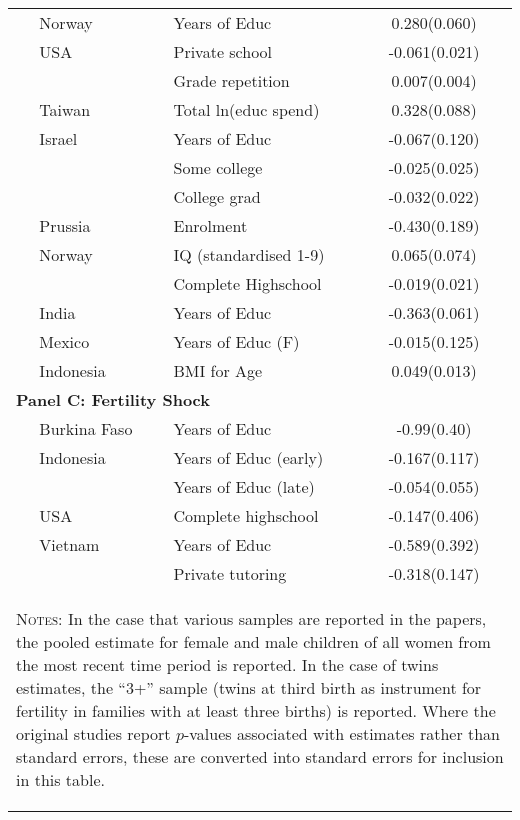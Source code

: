 \documentclass{article}
\begin{document}
\begin{spacing}{1.4}
\begin{table}[htpb!]
\begin{tabular}{lllc}
\citet{Blacketal2005}            &Norway   &Years of Educ        & 0.280(0.060)\\
\citet{ConleyGlauber2006}        &USA      &Private school       &-0.061(0.021)\\
                                 &         &Grade repetition     & 0.007(0.004)\\
\citet{Lee2008}                  &Taiwan   &Total ln(educ spend) & 0.328(0.088)\\
\citet{Angristetal2010}          &Israel   &Years of Educ        &-0.067(0.120)\\
                                 &         &Some college         &-0.025(0.025)\\
                                 &         &College grad         &-0.032(0.022)\\
\citet{Beckeretal2010}           &Prussia  &Enrolment            &-0.430(0.189)\\
\citet{Blacketal2010}            &Norway   &IQ (standardised 1-9)& 0.065(0.074)\\
                                 &         &Complete Highschool  &-0.019(0.021)\\
\citet{KumarKugler2011}          &India    &Years of Educ        &-0.363(0.061)\\
\citet{FitzsimonsMalde2014}      &Mexico   &Years of Educ (F)    &-0.015(0.125)\\ 
\citet{MillimetWang2011}         &Indonesia&BMI for Age          & 0.049(0.013)\\
\midrule
\multicolumn{4}{l}{\textbf{Panel C: Fertility Shock}} \\
\citet{Bougmaetal2015}           &Burkina Faso&Years of Educ        &-0.99(0.40)\\ 
\citet{Marlani2008}              &Indonesia   &Years of Educ (early)&-0.167(0.117)\\ 
                                 &            &Years of Educ (late) &-0.054(0.055)\\
\citet{Hotzetal1997}             &USA         &Complete highschool&-0.147(0.406)\\
\citet{DangRogers2013}           &Vietnam     &Years of Educ        &-0.589(0.392)\\
                                 &            &Private tutoring     &-0.318(0.147)\\
\bottomrule
\multicolumn{4}{p{12.9cm}}{\begin{footnotesize}\textsc{Notes:} In the case that 
various samples are reported in the papers, the pooled estimate for female and
male children of all women from the most recent time period is reported. In the 
case of twins estimates, the ``3+'' sample (twins at third birth as instrument
for fertility in  families with at least three births) is
reported.  Where the original studies report $p$-values associated with estimates 
rather than standard errors, these are converted into standard errors for 
inclusion in this table.
\end{footnotesize}}
\end{tabular}     
\end{table}


\end{spacing}
\end{document}
